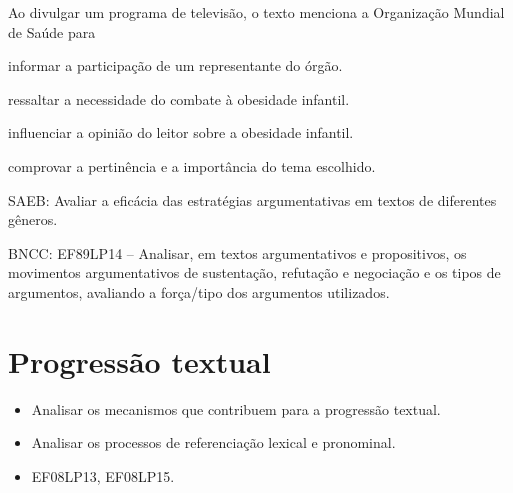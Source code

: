 Ao divulgar um programa de televisão, o texto menciona a Organização
Mundial de Saúde para

\begin{escolha}
\item informar a participação de um representante do órgão.

\item ressaltar a necessidade do combate à obesidade infantil.

\item influenciar a opinião do leitor sobre a obesidade infantil.

\item comprovar a pertinência e a importância do tema escolhido.
\end{escolha}

SAEB: Avaliar a eficácia das estratégias argumentativas em textos de
diferentes gêneros.

BNCC: EF89LP14 -- Analisar, em textos argumentativos e propositivos, os
movimentos argumentativos de sustentação, refutação e negociação e os
tipos de argumentos, avaliando a força/tipo dos argumentos utilizados.

\chapter{Progressão textual}


\begin{itemize} 
\item Analisar os mecanismos que contribuem
para a progressão textual. 
\item Analisar os processos de referenciação
lexical e pronominal.
\end{itemize}


\begin{itemize}
\tightlist
\item
  EF08LP13, EF08LP15.
\end{itemize}


